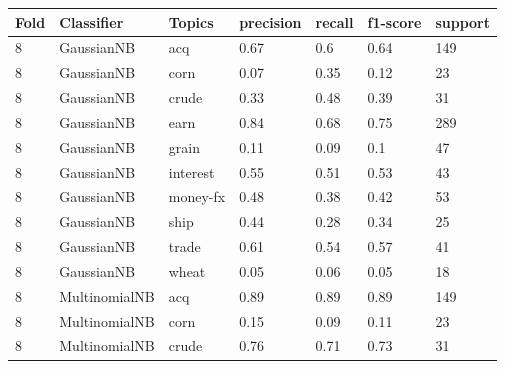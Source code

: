 \documentclass{article}
\begin{document}
\begin{table}[h]
\begin{tabular}{lllllll}
\textbf{Fold} & \textbf{Classifier}    & \textbf{Topics} & \textbf{precision} & \textbf{recall} & \textbf{f1-score} & \textbf{support} \\ \hline
8             & GaussianNB             & acq             & 0.67               & 0.6             & 0.64              & 149              \\
8             & GaussianNB             & corn            & 0.07               & 0.35            & 0.12              & 23               \\
8             & GaussianNB             & crude           & 0.33               & 0.48            & 0.39              & 31               \\
8             & GaussianNB             & earn            & 0.84               & 0.68            & 0.75              & 289              \\
8             & GaussianNB             & grain           & 0.11               & 0.09            & 0.1               & 47               \\
8             & GaussianNB             & interest        & 0.55               & 0.51            & 0.53              & 43               \\
8             & GaussianNB             & money-fx        & 0.48               & 0.38            & 0.42              & 53               \\
8             & GaussianNB             & ship            & 0.44               & 0.28            & 0.34              & 25               \\
8             & GaussianNB             & trade           & 0.61               & 0.54            & 0.57              & 41               \\
8             & GaussianNB             & wheat           & 0.05               & 0.06            & 0.05              & 18               \\
8             & MultinomialNB          & acq             & 0.89               & 0.89            & 0.89              & 149              \\
8             & MultinomialNB          & corn            & 0.15               & 0.09            & 0.11              & 23               \\
8             & MultinomialNB          & crude           & 0.76               & 0.71            & 0.73              & 31               \\

\end{tabular}
\end{table}
\end{document}
